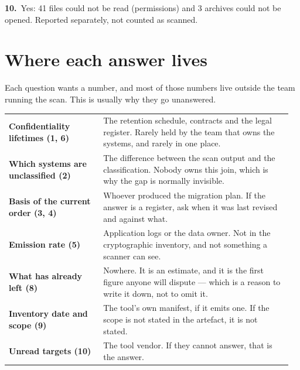 \documentclass[10pt,a4paper]{article}
\begin{document}
\noindent\textbf{10.}\ {\small Yes: 41 files could not be read (permissions) and 3 archives could not be opened. Reported separately, not counted as scanned.}\par\vspace{3pt}
\vspace{6pt}\section*{Where each answer lives}
{\small Each question wants a number, and most of those numbers live outside the team running the scan. This is usually why they go unanswered.\par}\vspace{3pt}
\begin{small}\begin{tabular}{@{}p{0.32\linewidth}p{0.64\linewidth}@{}}
\textbf{Confidentiality lifetimes (1, 6)} & The retention schedule, contracts and the legal register. Rarely held by the team that owns the systems, and rarely in one place. \\[3pt]
\textbf{Which systems are unclassified (2)} & The difference between the scan output and the classification. Nobody owns this join, which is why the gap is normally invisible. \\[3pt]
\textbf{Basis of the current order (3, 4)} & Whoever produced the migration plan. If the answer is a register, ask when it was last revised and against what. \\[3pt]
\textbf{Emission rate (5)} & Application logs or the data owner. Not in the cryptographic inventory, and not something a scanner can see. \\[3pt]
\textbf{What has already left (8)} & Nowhere. It is an estimate, and it is the first figure anyone will dispute --- which is a reason to write it down, not to omit it. \\[3pt]
\textbf{Inventory date and scope (9)} & The tool's own manifest, if it emits one. If the scope is not stated in the artefact, it is not stated. \\[3pt]
\textbf{Unread targets (10)} & The tool vendor. If they cannot answer, that is the answer. \\[3pt]
\end{tabular}\end{small}
\newpage
\end{document}
